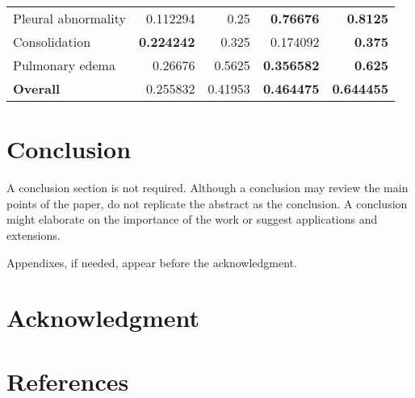 \documentclass[journal,twoside,web, 11pt]{ieeecolor}
\begin{document}
\begin{table*}[]
\begin{tabular}{lrrrr}
Pleural abnormality         & 0.112294                                                                                        & 0.25                                                                                            & \textbf{0.76676}                                                                                & \textbf{0.8125}                                                                                 \\
Consolidation               & \textbf{0.224242}                                                                               & 0.325                                                                                           & 0.174092                                                                               & \textbf{0.375}                                                                                  \\
Pulmonary edema             & 0.26676                                                                                         & 0.5625                                                                                          & \textbf{0.356582}                                                                               & \textbf{0.625}                                                                                  \\ \hline
\textbf{Overall}            & 0.255832                                                                                        & 0.41953                                                                                         & \textbf{0.464475}                                                                               & \textbf{0.644455}                                                                               \\ \hline
\end{tabular}
\end{table*}


\section{Conclusion}
A conclusion section is not required. Although a conclusion may review the 
main points of the paper, do not replicate the abstract as the conclusion. A 
conclusion might elaborate on the importance of the work or suggest 
applications and extensions. 

\appendices


Appendixes, if needed, appear before the acknowledgment.




\section*{Acknowledgment}

\section*{References}
\end{document}
